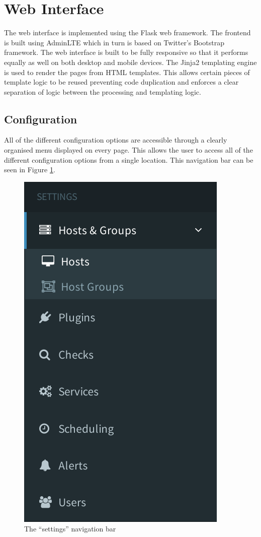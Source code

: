 \documentclass[bsc,deptreport,twoside,parskip,singlespacing,notimes]{infthesis}
\begin{document}
\section{Web Interface}

	The web interface is implemented using the Flask web framework.  The frontend
	is built using AdminLTE which in turn is based on Twitter's Bootstrap
	framework.  The web interface is built to be fully responsive so that it
	performs equally as well on both desktop and mobile devices.  The Jinja2
	templating engine is used to render the pages from HTML templates.  This allows
	certain pieces of template logic to be reused preventing code duplication and
	enforces a clear separation of logic between the processing and templating
	logic.


\subsection{Configuration}

	All of the different configuration options are accessible through a clearly
	organised menu displayed on every page.  This allows the user to access all of
	the different configuration options from a single location.  This navigation
	bar can be seen in Figure \ref{settings-nav}.

\begin{figure}[H]
	\centering
	\caption{The ``settings'' navigation bar}
	\label{settings-nav}
	\includegraphics[scale=0.7]{assets/screenshots/settings-nav.pdf}
\end{figure}
\end{document}

